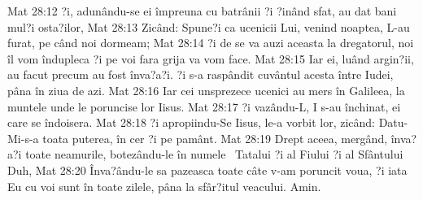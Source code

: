 Mat 28:12  ?i, adunându-se ei împreuna cu batrânii ?i ?inând sfat, au dat bani mul?i osta?ilor,
Mat 28:13  Zicând: Spune?i ca ucenicii Lui, venind noaptea, L-au furat, pe când noi dormeam;
Mat 28:14  ?i de se va auzi aceasta la dregatorul, noi îl vom îndupleca ?i pe voi fara grija va vom face.
Mat 28:15  Iar ei, luând argin?ii, au facut precum au fost înva?a?i. ?i s-a raspândit cuvântul acesta între Iudei, pâna în ziua de azi.
Mat 28:16  Iar cei unsprezece ucenici au mers în Galileea, la muntele unde le poruncise lor Iisus.
Mat 28:17  ?i vazându-L, I s-au închinat, ei care se îndoisera.
Mat 28:18  ?i apropiindu-Se Iisus, le-a vorbit lor, zicând: Datu-Mi-s-a toata puterea, în cer ?i pe pamânt.
Mat 28:19  Drept aceea, mergând, înva?a?i toate neamurile, botezându-le în numele  Tatalui ?i al Fiului ?i al Sfântului Duh,
Mat 28:20  Înva?ându-le sa pazeasca toate câte v-am poruncit voua, ?i iata Eu cu voi sunt în toate zilele, pâna la sfâr?itul veacului. Amin.


